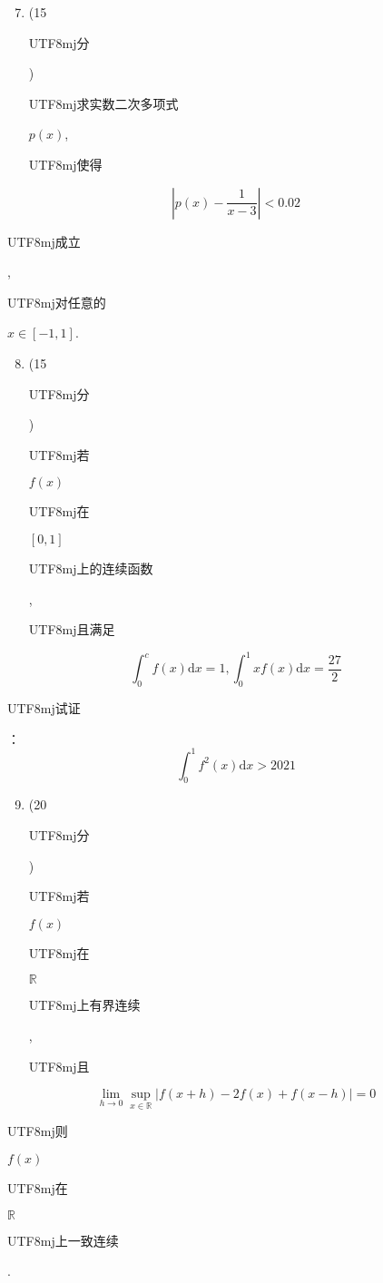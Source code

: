 \documentclass[10pt]{article}
\begin{document}
\begin{enumerate}
  \setcounter{enumi}{6}
  \item (15 \begin{CJK}{UTF8}{mj}分\end{CJK}) \begin{CJK}{UTF8}{mj}求实数二次多项式\end{CJK} $p(x)$, \begin{CJK}{UTF8}{mj}使得\end{CJK}
\end{enumerate}
$$
\left|p(x)-\frac{1}{x-3}\right|<0.02
$$
\begin{CJK}{UTF8}{mj}成立\end{CJK}, \begin{CJK}{UTF8}{mj}对任意的\end{CJK} $x \in[-1,1]$.

\begin{enumerate}
  \setcounter{enumi}{7}
  \item (15 \begin{CJK}{UTF8}{mj}分\end{CJK}) \begin{CJK}{UTF8}{mj}若\end{CJK} $f(x)$ \begin{CJK}{UTF8}{mj}在\end{CJK} $[0,1]$ \begin{CJK}{UTF8}{mj}上的连续函数\end{CJK}, \begin{CJK}{UTF8}{mj}且满足\end{CJK}
\end{enumerate}
$$
\int_{0}^{c} f(x) \mathrm{d} x=1, \int_{0}^{1} x f(x) \mathrm{d} x=\frac{27}{2}
$$
\begin{CJK}{UTF8}{mj}试证\end{CJK}：
$$
\int_{0}^{1} f^{2}(x) \mathrm{d} x>2021
$$

\begin{enumerate}
  \setcounter{enumi}{8}
  \item (20 \begin{CJK}{UTF8}{mj}分\end{CJK}) \begin{CJK}{UTF8}{mj}若\end{CJK} $f(x)$ \begin{CJK}{UTF8}{mj}在\end{CJK} $\mathbb{R}$ \begin{CJK}{UTF8}{mj}上有界连续\end{CJK}, \begin{CJK}{UTF8}{mj}且\end{CJK}
\end{enumerate}
$$
\lim _{h \rightarrow 0} \sup _{x \in \mathbb{R}}|f(x+h)-2 f(x)+f(x-h)|=0
$$
\begin{CJK}{UTF8}{mj}则\end{CJK} $f(x)$ \begin{CJK}{UTF8}{mj}在\end{CJK} $\mathbb{R}$ \begin{CJK}{UTF8}{mj}上一致连续\end{CJK}.
\end{document}
